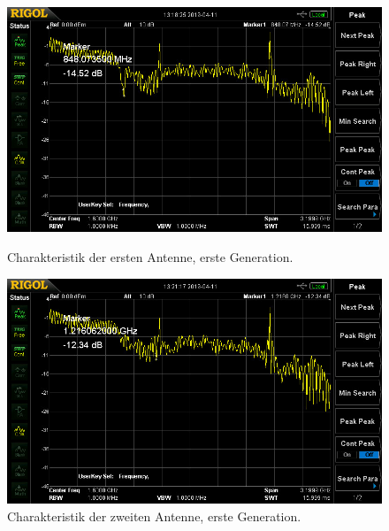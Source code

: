 \documentclass[titlepage,11pt,a4paper,ngerman]{article}
\begin{document}
\begin{figure}[ht]
	\includegraphics[scale=0.075]{Bilder/ant32.jpg}
	\centering
	\caption{Charakteristik der ersten Antenne, erste Generation.}
	\label{Ant1alt}
	\vspace{50pt}
%
	\includegraphics[scale=0.075]{Bilder/ant42.jpg}
	\centering
	\caption{Charakteristik der zweiten Antenne, erste Generation.}
	\label{Ant2alt}
\end{figure}
\end{document}
